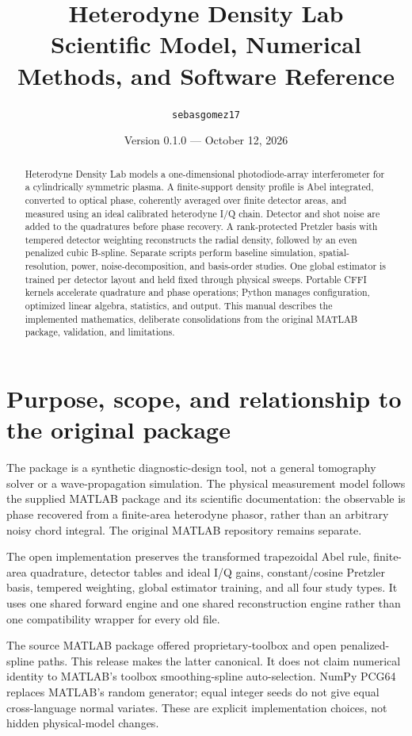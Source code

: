 \documentclass[11pt,letterpaper]{article}
\title{Heterodyne Density Lab\\\large Scientific Model, Numerical Methods, and Software Reference}
\author{\texttt{sebasgomez17}}
\date{Version 0.1.0 --- October 12, 2026}
\begin{document}
\maketitle
\begin{abstract}
Heterodyne Density Lab models a one-dimensional photodiode-array interferometer
for a cylindrically symmetric plasma. A finite-support density profile is Abel
integrated, converted to optical phase, coherently averaged over finite detector
areas, and measured using an ideal calibrated heterodyne I/Q chain. Detector and
shot noise are added to the quadratures before phase recovery. A rank-protected
Pretzler basis with tempered detector weighting reconstructs the radial density,
followed by an even penalized cubic B-spline. Separate scripts perform baseline
simulation, spatial-resolution, power, noise-decomposition, and basis-order
studies. One global estimator is trained per detector layout and held fixed
through physical sweeps. Portable CFFI kernels accelerate quadrature and phase
operations; Python manages configuration, optimized linear algebra, statistics,
and output. This manual describes the implemented mathematics, deliberate
consolidations from the original MATLAB package, validation, and limitations.
\end{abstract}
\tableofcontents
\listoffigures
\clearpage

\section{Purpose, scope, and relationship to the original package}
The package is a synthetic diagnostic-design tool, not a general tomography
solver or a wave-propagation simulation. The physical measurement model follows
the supplied MATLAB package and its scientific documentation: the observable
is phase recovered from a finite-area heterodyne phasor, rather than an arbitrary
noisy chord integral. The original MATLAB repository remains separate.

The open implementation preserves the transformed trapezoidal Abel rule,
finite-area quadrature, detector tables and ideal I/Q gains, constant/cosine
Pretzler basis, tempered weighting, global estimator training, and all four
study types. It uses one shared forward engine and one shared reconstruction
engine rather than one compatibility wrapper for every old file.

The source MATLAB package offered proprietary-toolbox and open penalized-spline
paths. This release makes the latter canonical. It does not claim numerical
identity to MATLAB's toolbox smoothing-spline auto-selection. NumPy PCG64
replaces MATLAB's random generator; equal integer seeds do not give equal
cross-language normal variates. These are explicit implementation choices,
not hidden physical-model changes.
\end{document}
